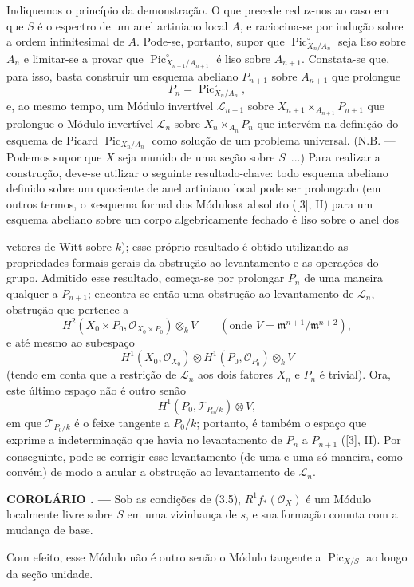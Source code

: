 \documentclass[11pt,twoside,openany]{book}
\numberwithin{equation}{section}
\newcommand{\src}[1]{%
  \phantomsection\hypertarget{src:#1}{}%
  \marginpar{\raggedleft\footnotesize\sffamily #1}%
}
\theoremstyle{plain}
\theoremstyle{definition}
\theoremstyle{remark}
\newcommand{\result}[2]{%
  \par\medskip\noindent\textbf{#1%
  \if\relax\detokenize{#2}\relax\else\space#2\fi. ---}\enspace
}
\newcommand{\FgaUnitKey}{frontmatter}
\renewcommand{\src}[1]{%
  \phantomsection\hypertarget{src:\FgaUnitKey:#1}{}%
  \marginpar{\raggedleft\footnotesize\sffamily #1}%
}
\begin{document}
Indiquemos o princípio da demonstração. O que precede reduz-nos ao caso em que
$S$ é o espectro de um anel artiniano local $A$, e raciocina-se por indução
sobre a ordem infinitesimal de $A$. Pode-se, portanto, supor que
$\operatorname{Pic}_{X_n/A_n}^\circ$ seja liso sobre $A_n$ e limitar-se a
provar que $\operatorname{Pic}_{X_{n+1}/A_{n+1}}^\circ$ é liso sobre
$A_{n+1}$. Constata-se que, para isso, basta construir um esquema abeliano
$P_{n+1}$ sobre $A_{n+1}$ que prolongue
\[
P_n=\operatorname{Pic}_{X_n/A_n}^\circ,
\]
e, ao mesmo tempo, um Módulo invertível $\mathcal L_{n+1}$ sobre
$X_{n+1}\times_{A_{n+1}}P_{n+1}$ que prolongue o Módulo invertível
$\mathcal L_n$ sobre $X_n\times_{A_n}P_n$ que intervém na definição do esquema
de Picard $\operatorname{Pic}_{X_n/A_n}$ como solução de um problema universal.
(N.B. --- Podemos supor que $X$ seja munido de uma seção sobre $S$~...) Para
realizar a construção, deve-se utilizar o seguinte resultado-chave: todo
esquema abeliano definido sobre um quociente de anel artiniano local pode ser
prolongado (em outros termos, o «esquema formal dos Módulos» absoluto ([3], II)
para um esquema abeliano sobre um corpo algebricamente fechado é liso sobre o
anel dos
\src{240}
vetores de Witt sobre $k$); esse próprio resultado é obtido utilizando as
propriedades formais gerais da obstrução ao levantamento e as operações do
grupo. Admitido esse resultado, começa-se por prolongar $P_n$ de uma maneira
qualquer a $P_{n+1}$; encontra-se então uma obstrução ao levantamento de
$\mathcal L_n$, obstrução que pertence a
\[
H^2(X_0\times P_0,\mathcal O_{X_0\times P_0})\otimes_k V
\qquad(\text{onde }V=\mathfrak m^{n+1}/\mathfrak m^{n+2}),
\]
e até mesmo ao subespaço
\[
H^1(X_0,\mathcal O_{X_0})\otimes
H^1(P_0,\mathcal O_{P_0})\otimes_k V
\]
(tendo em conta que a restrição de $\mathcal L_n$ aos dois fatores $X_n$ e
$P_n$ é trivial). Ora, este último espaço não é outro senão
\[
H^1(P_0,\mathcal T_{P_0/k})\otimes V,
\]
em que $\mathcal T_{P_0/k}$ é o feixe tangente a $P_0/k$; portanto, é também o
espaço que exprime a indeterminação que havia no levantamento de $P_n$ a
$P_{n+1}$ ([3], II). Por conseguinte, pode-se corrigir esse levantamento (de
uma e uma só maneira, como convém) de modo a anular a obstrução ao levantamento
de $\mathcal L_n$.

\result{COROLÁRIO}{3.6} Sob as condições de (3.5),
$R^1f_*(\mathcal O_X)$ é um Módulo localmente livre sobre $S$ em uma
vizinhança de $s$, e sua formação comuta com a mudança de base.

Com efeito, esse Módulo não é outro senão o Módulo tangente a
$\operatorname{Pic}_{X/S}$ ao longo da seção unidade.
\end{document}
